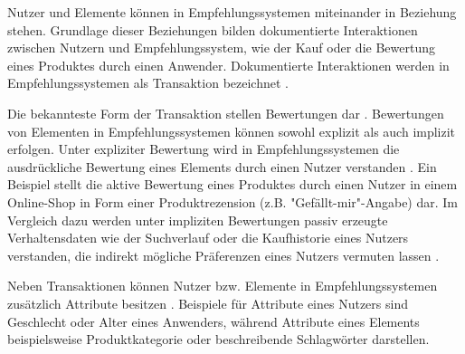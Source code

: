Nutzer und Elemente können in Empfehlungssystemen miteinander in Beziehung stehen.
Grundlage dieser Beziehungen bilden dokumentierte Interaktionen zwischen Nutzern und Empfehlungssystem, wie der Kauf oder die Bewertung eines Produktes durch einen Anwender.
Dokumentierte Interaktionen werden in Empfehlungssystemen als Transaktion bezeichnet \cite[S. 9]{ricci:inbook}.

Die bekannteste Form der Transaktion stellen Bewertungen dar \cite[S. 9]{ricci:inbook}.
Bewertungen von Elementen in Empfehlungssystemen können sowohl explizit als auch implizit erfolgen.
Unter expliziter Bewertung wird in Empfehlungssystemen die ausdrückliche Bewertung eines Elements durch einen Nutzer verstanden \cite[S. 9]{ricci:inbook}.
Ein Beispiel stellt die aktive Bewertung eines Produktes durch einen Nutzer in einem Online-Shop in Form einer Produktrezension (z.B. "Gefällt-mir"-Angabe) dar.
Im Vergleich dazu werden unter impliziten Bewertungen passiv erzeugte Verhaltensdaten wie der Suchverlauf oder die Kaufhistorie eines Nutzers verstanden, die indirekt mögliche Präferenzen eines Nutzers vermuten lassen \cite[S. 149]{jadidinejad:inproceedings}\cite[S. 403]{unternährer:article}.

Neben Transaktionen können Nutzer bzw. Elemente in Empfehlungssystemen zusätzlich Attribute besitzen \cite[S. 735]{adomavicius:inproceedings}\cite[S. 8]{recommenderSystems:2016}.
Beispiele für Attribute eines Nutzers sind Geschlecht oder Alter eines Anwenders, während Attribute eines Elements beispielsweise Produktkategorie oder beschreibende Schlagwörter darstellen.

